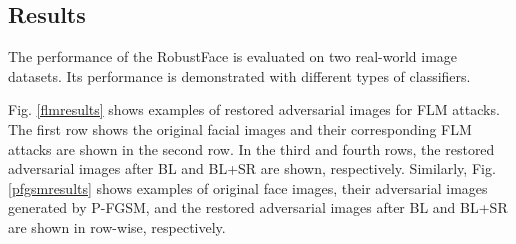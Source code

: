 \documentclass[sn-mathphys]{sn-jnl}%
\theoremstyle{thmstyleone}%
\theoremstyle{thmstyletwo}%
\theoremstyle{thmstylethree}%
\begin{document}
\subsection{Results}
 The performance of the RobustFace is evaluated on two real-world image datasets. Its performance is demonstrated with different types of classifiers.

 
 Fig. \ref{flmresults} shows examples of restored adversarial images for FLM attacks. The first row shows the original facial images and their corresponding FLM attacks are shown in the second row. In the third and fourth rows, the restored adversarial images after BL and BL+SR are shown, respectively. %
 Similarly, Fig. \ref{pfgsmresults} shows examples of original face images, their adversarial images generated by P-FGSM, and the restored adversarial images after BL and BL+SR are shown in row-wise, respectively. 

 
\end{document}

